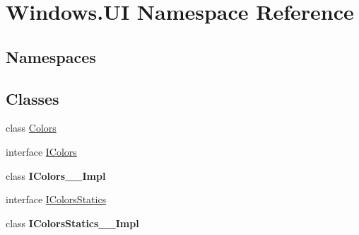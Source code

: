 \hypertarget{namespace_windows_1_1_u_i}{}\section{Windows.\+UI Namespace Reference}
\label{namespace_windows_1_1_u_i}
\subsection*{Namespaces}
\begin{DoxyCompactItemize}
\end{DoxyCompactItemize}
\subsection*{Classes}
\begin{DoxyCompactItemize}
\item 
class \hyperlink{class_windows_1_1_u_i_1_1_colors}{Colors}
\item 
interface \hyperlink{interface_windows_1_1_u_i_1_1_i_colors}{I\+Colors}
\item 
class {\bfseries I\+Colors\+\_\+\+\_\+\+Impl}
\item 
interface \hyperlink{interface_windows_1_1_u_i_1_1_i_colors_statics}{I\+Colors\+Statics}
\item 
class {\bfseries I\+Colors\+Statics\+\_\+\+\_\+\+Impl}
\end{DoxyCompactItemize}
